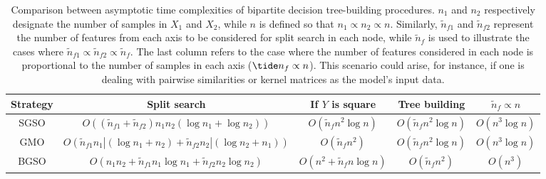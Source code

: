 \begin{table}[h]
    \centering
    \begin{tabular}{c|c|c|c|c}
        Strategy
        & Split search
        & If $Y$ is square
        & Tree building
        & $\tilde n_f \propto n$
        \\
        \hline \hline
        SGSO
            & $O((\tilde n_{f1} + \tilde n_{f2}) n_1 n_2 (\log n_1 + \log n_2))$
            & $O(\tilde n_f n^2 \log n)$
            & $O(\tilde n_f n^2 \log n)$
            & $O(n^3\log n)$
        \\
        GMO
            & $O(
                \tilde n_{f1} n_1|(\log n_1 + n_2)
                + \tilde n_{f2} n_2|(\log n_2 + n_1)
            )$
            & $O(\tilde n_f n^2)$
            & $O(\tilde n_f n^2 \log n)$
            & $O(n^3\log n)$
        \\
        BGSO
            & $O(
                n_1 n_2
                + \tilde n_{f1} n_1 \log n_1
                + \tilde n_{f2} n_2 \log n_2
            )
            $
            & $O(n^2 + \tilde n_f n \log n)$
            & $O(\tilde n_f n^2)$
            & $O(n^3)$
        \\
        \hline
    \end{tabular}
    \caption{
        Comparison between asymptotic time complexities of bipartite decision tree-building procedures.
        $n_1$ and $n_2$ respectively designate the number of samples in $X_1$ and $X_2$, while $n$ is defined so that $n_1 \propto n_2 \propto n$.
        Similarly, $\tilde n_{f1}$ and $\tilde n_{f2}$ represent the number of features from each axis to be considered for split search in each node,
        while $\tilde n_f$ is used to illustrate the cases where $\tilde n_{f1} \propto \tilde n_{f2} \propto \tilde n_f$.
        The last column refers to the case where the number of features considered in each node is proportional to the number of samples in each axis ($\tide n_f \propto n$). This scenario could arise, for instance, if one is dealing with pairwise similarities or kernel matrices as the model's input data.
    }
    \label{tab:O_comparison}
\end{table}


